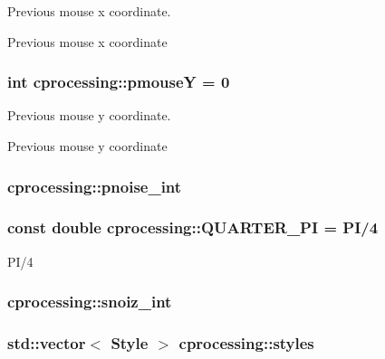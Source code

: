 \-Previous mouse x coordinate. 

\-Previous mouse x coordinate \hypertarget{namespacecprocessing_a51d209877748101ea857d64bc9b6ff2d}{
\subsubsection[{pmouse\-Y}]{\setlength{\rightskip}{0pt plus 5cm}int {\bf cprocessing\-::pmouse\-Y} = 0}}\label{namespacecprocessing_a51d209877748101ea857d64bc9b6ff2d}


\-Previous mouse y coordinate. 

\-Previous mouse y coordinate \hypertarget{namespacecprocessing_ae49abeea91d685f9a38c0b20b0de1977}{
\subsubsection[{pnoise\-\_\-int}]{ {\bf cprocessing\-::pnoise\-\_\-int}}}\label{namespacecprocessing_ae49abeea91d685f9a38c0b20b0de1977}
\hypertarget{namespacecprocessing_aa4fa2ff3538b68df8b95c6eba6c33a28}{
\subsubsection[{\-Q\-U\-A\-R\-T\-E\-R\-\_\-\-P\-I}]{\setlength{\rightskip}{0pt plus 5cm}const double {\bf cprocessing\-::\-Q\-U\-A\-R\-T\-E\-R\-\_\-\-P\-I} = {\bf \-P\-I}/4}}\label{namespacecprocessing_aa4fa2ff3538b68df8b95c6eba6c33a28}
\-P\-I/4 \hypertarget{namespacecprocessing_aab81f757257f375ea414cd3a49483e4c}{
\subsubsection[{snoiz\-\_\-int}]{ {\bf cprocessing\-::snoiz\-\_\-int}}}\label{namespacecprocessing_aab81f757257f375ea414cd3a49483e4c}
\hypertarget{namespacecprocessing_a58f7198a2386df8ea3559ea578069388}{
\subsubsection[{styles}]{\setlength{\rightskip}{0pt plus 5cm}std\-::vector$<$ {\bf \-Style} $>$ {\bf cprocessing\-::styles}}}\label{namespacecprocessing_a58f7198a2386df8ea3559ea578069388}
